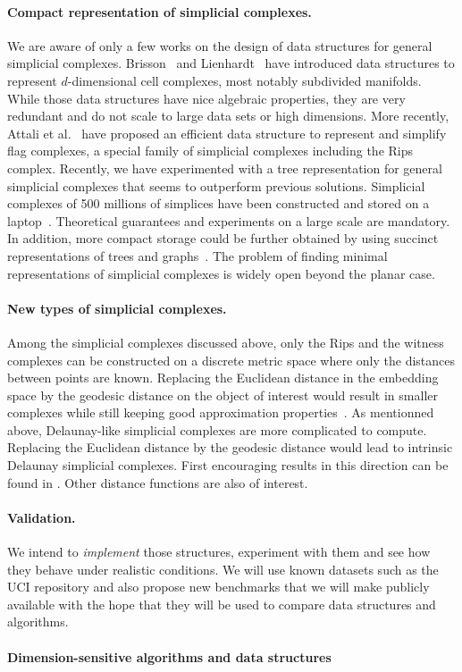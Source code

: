 \paragraph{Compact representation of simplicial complexes.} We are aware of only a few works on the design of data structures for general simplicial complexes. Brisson~\cite{Brisson:1989:RGS:73833.73858} and Lienhardt~\cite{DBLP:journals/ijcga/Lienhardt94} have introduced data structures to represent $d$-dimensional cell complexes, most notably subdivided manifolds. While those data structures have nice algebraic properties, they are very redundant and do not scale to large data sets or high dimensions. More recently, Attali et al.~\cite{Attali2011} have proposed an efficient data structure to represent and simplify flag complexes, a special family of simplicial complexes including the Rips complex. 
Recently, we have experimented with a tree representation for general simplicial
complexes that seems to outperform previous solutions. Simplicial complexes of 500 millions of simplices have been constructed and stored on a laptop~\cite{bm-dssc-2012}. 
Theoretical guarantees and experiments on a large scale are mandatory. In
addition, more compact storage could be further obtained by using
succinct representations of trees and graphs~\cite{Munro:2002:SRB:586840.586885,Ferragina:2005:SLT:1097112.1097456}. The problem of finding minimal representations of simplicial complexes is widely open beyond the planar case.


\paragraph{New types of simplicial complexes.}
Among the simplicial complexes discussed above, only the Rips and the witness complexes can be constructed on a discrete metric space where only the distances between points are known. 
Replacing the Euclidean distance in the embedding space by the geodesic distance on the object of interest would result in smaller complexes while still keeping good approximation properties~\cite{dl-clt-2009}.
As mentionned above, Delaunay-like simplicial complexes are more complicated to compute. Replacing the Euclidean distance by  the geodesic distance would lead to intrinsic Delaunay simplicial complexes. First encouraging results in this direction can be found in \cite{boissonnat2012stab}. Other distance functions are also of interest.


\paragraph{Validation.} 
We intend to {\em implement} those structures, experiment with them and see how they behave under realistic conditions. We will use known datasets such as the UCI repository \cite{} and also propose new benchmarks that we will make publicly available with the hope that they will be used to compare data structures and algorithms.

\paragraph{Dimension-sensitive algorithms and data structures} 







